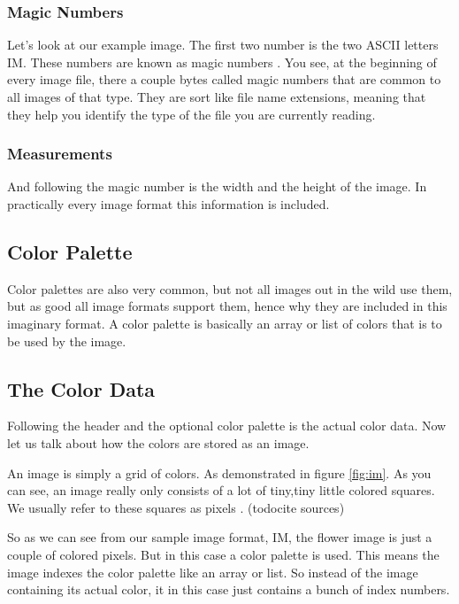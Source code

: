 \begin{refsection}
  \subsubsection{Magic Numbers}
  \label{sec:magic-numbers}

  Let's look at our example image. The first two number is the two
  ASCII letters IM. These numbers are known as magic numbers
  . You see, at the beginning of every image
  file, there a couple bytes called magic numbers that are common to
  all images of that type. They are sort like file name extensions,
  meaning that they help you identify the type of the file you are
  currently reading.

  \subsubsection{Measurements}
  \label{sec:measurements}

  And following the magic number is the width and the height of the
  image. In practically every image format this information is
  included.

  \subsection{Color Palette}
  \label{sec:color-pallete}

  Color palettes  are also very common, but not
  all images out in the wild use them, but as good all image formats support
  them, hence why they are included in this imaginary format. A color
  palette is basically an array or list of colors that is to be used
  by the image.

  \subsection{The Color Data}
  \label{sec:color-data}

  Following the header and the optional color palette is the actual
  color data. Now let us talk about how the colors are stored as an
  image.

  An image is simply a grid of colors. As demonstrated in figure
  \ref{fig:im}. As you can
  see, an image really only consists of a lot of tiny,tiny little
  colored squares. We usually refer to these squares as pixels
  . (todo{cite sources})

  So as we can see from our sample image format, IM, the flower image
  is just a couple of colored pixels. But in this case a color palette
  is used. This means the image indexes the color palette like an
  array or list. So instead of the image containing its actual color,
  it in this case just contains a bunch of index numbers.


\end{refsection}

